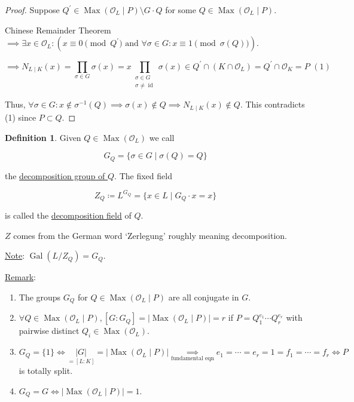 \documentclass[openany]{amsbook}
\numberwithin{section}{chapter}
\theoremstyle{definition}
\newtheorem*{definition}{Definition}
\begin{document}
\begin{proof}
    Suppose \(Q^{\prime} \in \operatorname{Max} (\mathcal{O} _L \mid P) \setminus G\cdot Q\) for some \(Q\in \operatorname{Max} (\mathcal{O}_L \mid P)\).
    
    Chinese Remainder Theorem \(\implies \exists x\in \mathcal{O} _L : \left( x \equiv 0 \pmod{Q^{\prime}} \text{ and } \forall \sigma \in G: x \equiv 1\pmod{\sigma (Q)} \right) \).

    \[
        \implies N_{L\mid K} (x) = \prod_{\sigma \in G} \sigma (x) = x \prod_{\substack{\sigma\in G \\ \sigma \neq \operatorname{id}}} \sigma (x) \in Q^{\prime} \cap (K\cap \mathcal{O}_L) = Q^{\prime} \cap \mathcal{O}_K = P \, \, (1)
    \]

    Thus, \(\forall \sigma \in G: x \notin \sigma ^{-1} (Q) \implies \sigma (x)\notin Q \implies N_{L\mid K}(x) \notin Q\). This contradicts (1) since \(P \subset Q\). 

\end{proof}

\begin{definition}
    Given \(Q\in \operatorname{Max} (\mathcal{O}_L) \) we call

    \[
        G_Q = \{ \sigma \in G \mid \sigma (Q) = Q \} 
    \]

    the \underline{decomposition group of \(Q\)}. The fixed field
    
    \[
        Z_Q \coloneqq L^{G_Q} = \{ x \in L \mid G_Q \cdot x = x \} 
    \]

    is called the \underline{decomposition field} of \(Q\).

    \(Z\) comes from the German word `Zerlegung' roughly meaning decomposition.
\end{definition}

\underline{Note}: \(\operatorname{Gal}(L / Z_Q) = G_Q\).

\underline{Remark}:

\begin{enumerate}[label=\arabic*)]
    \item The groups \(G_Q\) for \(Q\in \operatorname{Max}(\mathcal{O}_L \mid P)\) are all conjugate in \(G\).
    \item \(\forall Q\in \operatorname{Max}(\mathcal{O}_L \mid P), [G:G_Q] = \vert\operatorname{Max}(\mathcal{O}_L \mid P)\vert = r\) if \(P = Q_1^{e_1}\cdots Q_r^{e_r}\) with pairwise distinct \(Q_i\in \operatorname{Max} (\mathcal{O}_L)\).
    \item \(G_Q = \{ 1 \} \iff \underset{=[L:K]}{\vert G \vert} = \vert \operatorname{Max} (\mathcal{O} _L \mid P) \vert \underset{\text{fundamental eqn} }{\implies } e_1 = \cdots = e_r = 1 = f_1 = \cdots = f_r \iff P\) is totally split.
    \item \(G_Q = G \iff \vert \operatorname{Max} (\mathcal{O} _L \mid P) \vert = 1\).   
\end{enumerate} 
\end{document}

